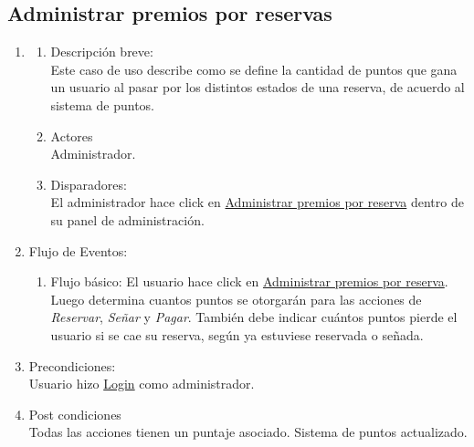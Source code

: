 \documentclass[a4paper,11pt]{article}
\begin{document}
\subsection{Administrar premios por reservas}
\begin{enumerate}

    \item
    \begin{enumerate}
    \item Descripción breve: \\
        Este caso de uso describe como se define la cantidad de puntos que gana
        un usuario al pasar por los distintos estados de una reserva, de acuerdo
        al sistema de puntos.
    \item Actores \\
        Administrador.
    \item Disparadores: \\
        El administrador hace click en \underline{Administrar premios por reserva}
        dentro de su panel de administración.
    \end{enumerate}

    \item Flujo de Eventos: 

    \begin{enumerate}

        \item Flujo básico:
            El usuario hace click en \underline{Administrar premios por reserva}.
            Luego determina cuantos puntos se otorgarán para las acciones de
            \textit{Reservar}, \textit{Señar} y \textit{Pagar}.
            También debe indicar cuántos puntos pierde el usuario si se cae
            su reserva, según ya estuviese reservada o señada.
    \end{enumerate}

    \item Precondiciones: \\
        Usuario hizo \underline{Login} como administrador.

    \item Post condiciones \\
        Todas las acciones tienen un puntaje asociado. Sistema de puntos
        actualizado.

\end{enumerate}

\end{document}
